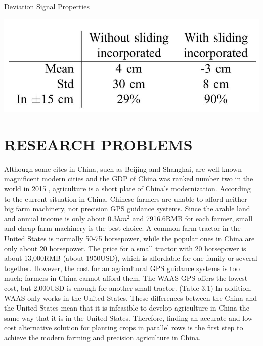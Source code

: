 \documentclass[letterpaper,12pt,oneside]{book}
\begin{document}
		\begin{table}[ht!]
			\begin{center}
				\caption{Deviation Signal Properties}
				\includegraphics[scale = 0.5]{slidingresult.jpg}
			\end{center}
		\end{table}
		

		\chapter{RESEARCH PROBLEMS}
		Although some cites in China, such as Beijing and Shanghai, are well-known magnificent modern cities and the GDP of China was ranked number two in the world in 2015 \cite{GDP2015}, agriculture is a short plate of China's modernization. According to the current situation in China, Chinese farmers are unable to afford neither big farm machinery, nor precision GPS guidance systems. Since the arable land and annual income is only about 0.3$hm^{2}$ and 7916.6RMB for each farmer, small and cheap farm machinery is the best choice. A common farm tractor in the United States is normally 50-75 horsepower, while the popular ones in China are only about 20 horsepower. The price for a small tractor with 20 horsepower is about 13,000RMB (about 1950USD), which is affordable for one family or several together. However, the cost for an agricultural GPS guidance systems is too much; farmers in China cannot afford them. The WAAS GPS offers the lowest cost, but 2,000USD is enough for another small tractor. (Table 3.1) In addition, WAAS only works in the United States. These differences between the China and the United States mean that it is infeasible to develop agriculture in China the same way that it is in the United States. Therefore, finding an accurate and low-cost alternative solution for planting crops in parallel rows is the first step to achieve the modern farming and precision agriculture in China.
		
\end{document}
